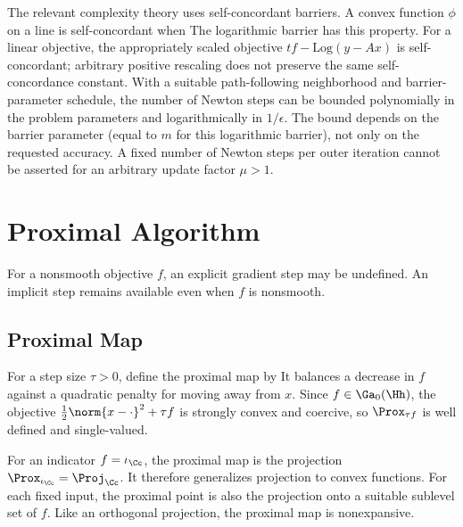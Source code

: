 The relevant complexity theory uses self-concordant barriers. A convex function $\phi$ on a line is self-concordant when
The logarithmic barrier has this property. For a linear objective, the appropriately scaled objective $t f-\mathrm{Log}(y-Ax)$ is self-concordant; arbitrary positive rescaling does not preserve the same self-concordance constant. With a suitable path-following neighborhood and barrier-parameter schedule, the number of Newton steps can be bounded polynomially in the problem parameters and logarithmically in $1/\epsilon$. The bound depends on the barrier parameter (equal to $m$ for this logarithmic barrier), not only on the requested accuracy. A fixed number of Newton steps per outer iteration cannot be asserted for an arbitrary update factor $\mu>1$.

\section{Proximal Algorithm}

For a nonsmooth objective $f$, an explicit gradient step may be undefined. An implicit step remains available even when $f$ is nonsmooth.


\subsection{Proximal Map}

For a step size $\tau>0$, define the proximal map by
It balances a decrease in $f$ against a quadratic penalty for moving away from $x$.
%
Since $f\in\Ga_0(\Hh)$, the objective $\frac12\norm{x-\cdot}^2+\tau f$ is strongly convex and coercive, so $\Prox_{\tau f}$ is well defined and single-valued.

For an indicator $f=\iota_\Cc$, the proximal map is the projection $\Prox_{\iota_\Cc}=\Proj_{\Cc}$. It therefore generalizes projection to convex functions. For each fixed input, the proximal point is also the projection onto a suitable sublevel set of $f$. Like an orthogonal projection, the proximal map is nonexpansive.

